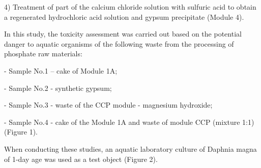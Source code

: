 \begin{multicols}{2}
4) Treatment of part of the calcium chloride solution with sulfuric acid
to obtain a regenerated hydrochloric acid solution and gypsum
precipitate (Module 4).

In this study, the toxicity assessment was carried out based on the
potential danger to aquatic organisms of the following waste from the
processing of phosphate raw materials:

- Sample No.1 -- cake of Module 1A;

- Sample No.2 - synthetic gypsum;

- Sample No.3 - waste of the CCP module - magnesium hydroxide;

- Sample No.4 - cake of the Module 1A and waste of module CCP (mixture
1:1) (Figure 1).
\end{multicols}


When conducting these studies, an aquatic laboratory culture of Daphnia
magna of 1-day age was used as a test object (Figure 2).

